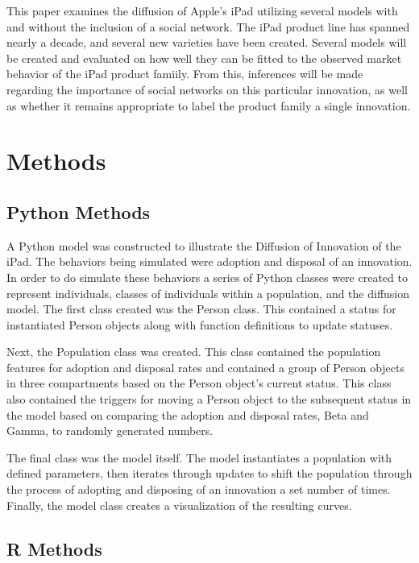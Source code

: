 \documentclass[11pt]{article}
\begin{document}
This paper examines the diffusion of Apple's iPad utilizing several models with and without the inclusion of a social network. The iPad product line has spanned nearly a decade, and several new varieties have been created. Several models will be created and evaluated on how well they can be fitted to the observed market behavior of the iPad product famiily. From this, inferences will be made regarding the importance of social networks on this particular innovation, as well as whether it remains appropriate to label the product family a single innovation. 


\section{Methods}

\subsection{Python Methods}

A Python model was constructed to illustrate the Diffusion of Innovation of the iPad. The behaviors being simulated were adoption and disposal of an innovation. In order to do simulate these behaviors a series of Python classes were created to represent individuals, classes of individuals within a population, and the diffusion model. The first class created was the Person class. This contained a status for instantiated Person objects along with function definitions to update statuses.


Next, the Population class was created. This class contained the population features for adoption and disposal rates and contained a group of Person objects in three compartments based on the Person object's current status. This class also contained the triggers for moving a Person object to the subsequent status in the model based on comparing the adoption and disposal rates, Beta and Gamma, to randomly generated numbers. 


The final class was the model itself. The model instantiates a population with defined parameters, then iterates through updates to shift the population through the process of adopting and disposing of an innovation a set number of times. Finally, the model class creates a visualization of the resulting curves.

\subsection{R Methods}
\end{document}
